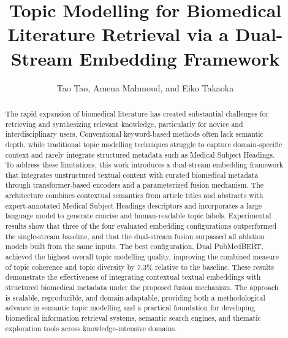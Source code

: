 \documentclass[authorproof,JACIII,researchpaper]{fujipressarticle}
\begin{document}
\pagestyle{fujipressstyle}

\title{Topic Modelling for Biomedical Literature Retrieval via a Dual-Stream Embedding Framework}
\author{Tao Tao, Amena Mahmoud, and Eiko Takaoka}
\address{Graduate School of Science and Technology, Sophia University, Tokyo 102-8554, Japan\\
Department of Computer Science, Faculty of Computers and Information, Kafrelsheikh University, Kafrelsheikh 33516, Egypt\\
E-mail: c2578666@eagle.sophia.ac.jp, m-g-eiko@sophia.ac.jp}
\maketitle

\begin{abstract}%
\noindent The rapid expansion of biomedical literature has created substantial challenges for retrieving and synthesizing relevant knowledge, particularly for novice and interdisciplinary users. Conventional keyword-based methods often lack semantic depth, while traditional topic modelling techniques struggle to capture domain-specific context and rarely integrate structured metadata such as Medical Subject Headings. To address these limitations, this work introduces a dual-stream embedding framework that integrates unstructured textual content with curated biomedical metadata through transformer-based encoders and a parameterized fusion mechanism. The architecture combines contextual semantics from article titles and abstracts with expert-annotated Medical Subject Headings descriptors and incorporates a large language model to generate concise and human-readable topic labels. {\color{red}Experimental results show that three of the four evaluated embedding configurations outperformed the single-stream baseline, and that the dual-stream fusion surpassed all ablation models built from the same inputs.} {\color{red}The best configuration, Dual PubMedBERT, achieved the highest overall topic modelling quality, improving the combined measure of topic coherence and topic diversity by 7.3\% relative to the baseline.} These results demonstrate the effectiveness of integrating contextual textual embeddings with structured biomedical metadata under the proposed fusion mechanism. The approach is scalable, reproducible, and domain-adaptable, providing both a methodological advance in semantic topic modelling and a practical foundation for developing biomedical information retrieval systems, semantic search engines, and thematic exploration tools across knowledge-intensive domains.
\end{abstract}
\end{document}
